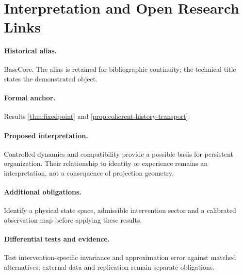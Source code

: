 \documentclass[11pt,a4paper]{article}
\theoremstyle{plain}
\theoremstyle{definition}
\theoremstyle{remark}
\begin{document}











\appendix


\section{Interpretation and Open Research Links}\label{sec:interpretation-open-links}
\paragraph{Historical alias.} BaseCore. The alias is retained for bibliographic continuity; the technical title states the demonstrated object.

\paragraph{Formal anchor.} Results \ref{thm:fixedpoint} and \ref{prop:coherent-history-transport}.

\paragraph{Proposed interpretation.} Controlled dynamics and compatibility provide a possible basis for persistent organization. Their relationship to identity or experience remains an interpretation, not a consequence of projection geometry.

\paragraph{Additional obligations.} Identify a physical state space, admissible intervention sector and a calibrated observation map before applying these results.

\paragraph{Differential tests and evidence.} Test intervention-specific invariance and approximation error against matched alternatives; external data and replication remain separate obligations.
\end{document}
